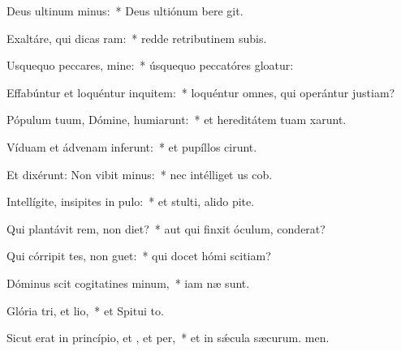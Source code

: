 \item Deus ultinum minus:~* Deus ultiónum bere git.
\item Exaltáre, qui dicas ram:~* redde retributinem subis.
\item Usquequo peccares, mine:~* úsquequo peccatóres gloatur:
\item Effabúntur et loquéntur inquitem:~* loquéntur omnes, qui operántur justiam?
\item Pópulum tuum, Dómine, humiarunt:~* et hereditátem tuam xarunt.
\item Víduam et ádvenam inferunt:~* et pupíllos cirunt.
\item Et dixérunt: Non vibit minus:~* nec intélliget us cob.
\item Intellígite, insipites in pulo:~* et stulti, alido pite.
\item Qui plantávit rem, non diet?~* aut qui finxit óculum,  conderat?
\item Qui córripit tes, non guet:~* qui docet hómi scitiam?
\item Dóminus scit cogitatines minum,~* iam næ sunt.
\item Glória tri, et lio,~* et Spitui to.
\item Sicut erat in princípio, et , et per,~* et in sǽcula sæcurum. men.
